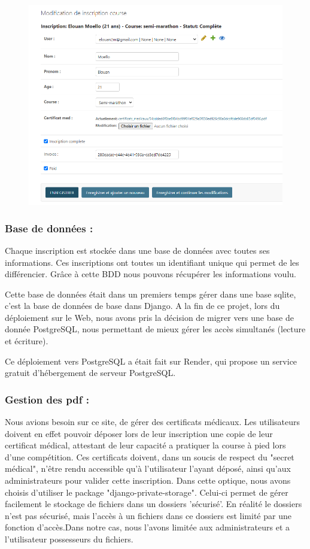 \documentclass[12pt]{article} %
\begin{document}
            \begin{figure}[hbtp]
            \centering
            \includegraphics[scale=0.6]{images/admin_gestion.PNG}
            \end{figure}
            \newpage
        \subsubsection{Base de données :}
            Chaque inscription est stockée dans une base de données avec toutes ses informations. Ces inscriptions ont toutes un identifiant unique qui permet de les différencier. Grâce à cette BDD nous pouvons récupérer les informations voulu.
            
            Cette base de données était dans un premiers temps gérer dans une base sqlite, c'est la base de données de base dans Django. A la fin de ce projet, lors du déploiement sur le Web, nous avons pris la décision de migrer vers une base de donnée PostgreSQL, nous permettant de mieux gérer les accès simultanés (lecture et écriture).
            
            Ce déploiement vers PostgreSQL a était fait sur Render, qui propose un service gratuit d'hébergement de serveur PostgreSQL.
        \subsubsection{Gestion des pdf :} 
			Nous avions besoin sur ce site, de gérer des certificats médicaux. Les utilisateurs doivent en effet pouvoir déposer lors de leur inscription une copie de leur certificat médical, attestant de leur capacité a pratiquer la course à pied lors d'une compétition.
			Ces certificats doivent, dans un soucis de respect du "secret médical", n'être rendu accessible qu'à l'utilisateur l'ayant déposé, ainsi qu'aux administrateurs pour valider cette inscription. Dans cette optique, nous avons choisis d'utiliser le package "django-private-storage". Celui-ci permet de gérer facilement le stockage de fichiers dans un dossiers 'sécurisé'. En réalité le dossiers n'est pas sécurisé, mais l'accès à un fichiers dans ce dossiers est limité par une fonction d'accès.Dans notre cas, nous l'avons limitée aux administrateurs et a l'utilisateur possesseurs du fichiers. 
			
\end{document}
